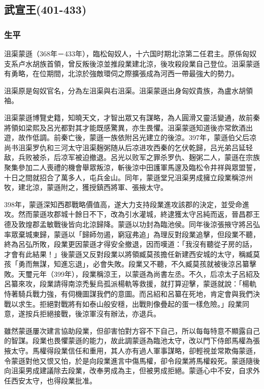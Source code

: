 
\subsection{武宣王\tiny(401-433)}

\subsubsection{生平}

沮渠蒙遜（368年－433年），臨松匈奴人，十六国时期北涼第二任君主。原係匈奴支系卢水胡族首領，曾反叛後涼並推段業建北涼，後攻殺段業自己登位。沮渠蒙遜有勇略，在位期間，北涼於強敵環伺之際擴張成為河西一帶最強大的勢力。

沮渠原是匈奴官名，分為左沮渠與右沮渠。沮渠蒙遜出身匈奴貴族，為盧水胡領袖。

沮渠蒙遜博覽史籍，知曉天文，才智出眾又有謀略，為人圓滑又靈活變通，故前秦將領如梁熙及呂光都對其才能既感驚異，亦生畏懼。沮渠蒙遜知道後亦常飲酒出遊，故作低調。前秦亡後，蒙遜一族依附呂光建立的後涼。397年，蒙遜伯父后凉尚书沮渠罗仇和三河太守沮渠麹粥随从后凉进攻西秦的乞伏乾歸，吕光弟吕延轻敌，兵败被杀，后凉军被迫撤退。呂光以败军之罪杀罗仇、麹粥二人，蒙遜在宗族聚集參加二人喪禮的機會舉眾叛涼，斬後涼中田護軍馬邃及臨松令井祥與眾盟誓，十日之間就招合了萬多人，屯兵金山。同年，蒙遜堂兄沮渠男成擁立段業稱涼州牧，建北涼，蒙遜附之，獲授鎮西將軍、張掖太守。

398年，蒙遜深知西郡戰略價值高，遂大力支持段業進攻該郡的決定，並受命進攻。然而蒙遜攻郡城十餘日不下，改為引水灌城，終逮獲太守呂純而返，晉昌郡王德及敦煌郡孟敏戰後皆向北涼歸降。蒙遜以功封為臨池侯。同年後涼張掖守將呂弘率眾棄城東歸，蒙遜以「歸師勿遏，窮寇弗追」為理反對段業追擊，但段業不聽，終為呂弘所敗，段業更因蒙遜才得安全撤退，因而嘆道：「我沒有聽從子房的話，才會有此結果！」後蒙遜又反對段業以將領臧莫孩擔任新建西安城的太守，稱臧莫孩「勇而無謀，知進忘退」，必會失敗。段業又不聽，不久臧莫孩就被後涼呂纂擊敗。天璽元年（399年），段業稱涼王，以蒙遜為尚書左丞。不久，后凉太子呂紹及呂纂來攻，段業請得南涼禿髮烏孤派楊軌等救援，就打算迎擊，蒙遜就說：「楊軌恃著騎兵戰力強，有伺機圖謀我們的意圖。而呂紹和呂纂在死地，肯定會與我們決戰以求生。拒絕對戰將有如泰山般安穩，出戰則像疊起的蛋一樣危險。」段業同意，遂按兵拒絕接戰，後涼軍沒有辦法，亦退兵。

雖然蒙遜屢次建言協助段業，但卻害怕對方容不下自己，所以每每特意不顯露自己的智謀。段業也畏懼蒙遜的能力，故此調蒙遜為臨池太守，改以門下侍郎馬權為張掖太守。馬權得段業信任和重用，其人亦有過人軍事謀略，卻輕視並常欺侮蒙遜，令蒙遜對他又恨又怕，於是向段業進言中傷馬權，卻令段業將馬權殺死。蒙遜隨後向沮渠男成建議除去段業，改奉男成為主，但被男成拒絕。蒙遜心中不安，自求外任西安太守，也得段業批准。

